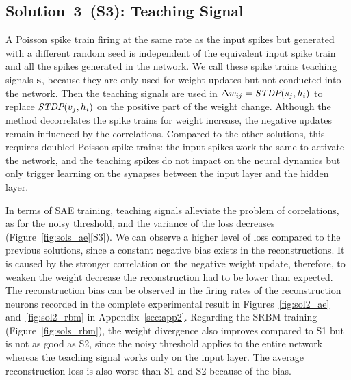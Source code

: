 \subsection{Solution~3~(S3): Teaching Signal}
A Poisson spike train firing at the same rate as the input spikes but generated with a different random seed is independent of the equivalent input spike train and all the spikes generated in the network.
We call these spike trains teaching signals $\bf{s}$, because they are only used for weight updates but not conducted into the network.
Then the teaching signals are used in $\Delta w_{ij} = \textit{\textrm{STDP}}(s_j,h_i)$ to replace $\textit{\textrm{STDP}}(v_j,h_i)$ on the positive part of the weight change.
Although the method decorrelates the spike trains for weight increase, the negative updates remain influenced by the correlations.  
Compared to the other solutions, this requires doubled Poisson spike trains: the input spikes work the same to activate the network, and the teaching spikes do not impact on the neural dynamics but only trigger learning on the synapses between the input layer and the hidden layer.

In terms of SAE training, teaching signals alleviate the problem of correlations, as for the noisy threshold, and the variance of the loss decreases (Figure~\ref{fig:sols_ae}[S3]).
We can observe a higher level of loss compared to the previous solutions, since a constant negative bias exists in the reconstructions.
It is caused by the stronger correlation on the negative weight update, therefore, to weaken the weight decrease the reconstruction had to be lower than expected.  
The reconstruction bias can be observed in the firing rates of the reconstruction neurons recorded in the complete experimental result in Figures~\ref{fig:sol2_ae} and~\ref{fig:sol2_rbm} in Appendix~\ref{sec:app2}.
Regarding the SRBM training (Figure~\ref{fig:sols_rbm}), the weight divergence also improves compared to S1 but is not as good as S2, since the noisy threshold applies to the entire network whereas the teaching signal works only on the input layer.
The average reconstruction loss is also worse than S1 and S2 because of the bias. 

